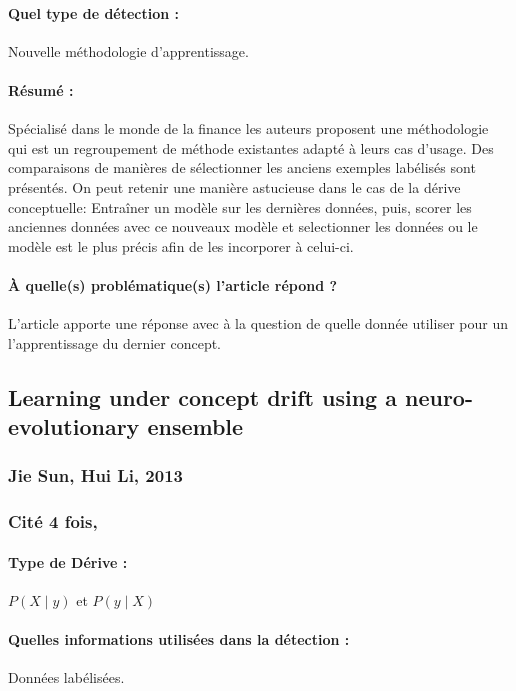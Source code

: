 \documentclass[11pt,a4paper]{report}
\begin{document}
\paragraph{Quel type de détection :} Nouvelle méthodologie d'apprentissage.

\paragraph{Résumé :} Spécialisé dans le monde de la finance les auteurs proposent une méthodologie qui est un regroupement de méthode existantes adapté à leurs cas d'usage. Des comparaisons de manières de sélectionner les anciens exemples labélisés sont présentés. On peut retenir une manière astucieuse dans le cas de la dérive conceptuelle: Entraîner un modèle sur les dernières données, puis, scorer les anciennes données avec ce nouveaux modèle et selectionner les données ou le modèle est le plus précis afin de les incorporer à celui-ci.

\paragraph{À quelle(s) problématique(s) l'article répond ?} L'article apporte une réponse avec à la question de quelle donnée utiliser pour un l'apprentissage du dernier concept.







\subsection{Learning under concept drift using a neuro-evolutionary ensemble}
\subsubsection{Jie Sun, Hui Li, 2013}

\subsubsection{Cité 4 fois, }

\paragraph{Type de Dérive :} $P(X\mid y)$ et $P(y \mid X)$ 
\paragraph{Quelles informations utilisées dans la détection :} Données labélisées.
\end{document}
